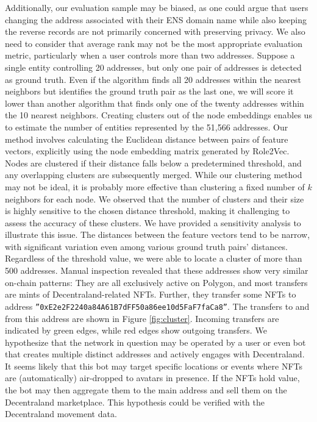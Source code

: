 \documentclass[12pt,a4paper,titlepage,oneside,english]{article}
\begin{document}
Additionally, our evaluation sample may be biased, as one could argue that users changing the address associated with their ENS domain name while also keeping the reverse records are not primarily concerned with preserving privacy. \newline
We also need to consider that average rank may not be the most appropriate evaluation metric, particularly when a user controls more than two addresses. Suppose a single entity controlling 20 addresses, but only one pair of addresses is detected as ground truth. Even if the algorithm finds all 20 addresses within the nearest neighbors but identifies the ground truth pair as the last one, we will score it lower than another algorithm that finds only one of the twenty addresses within the 10 nearest neighbors. \newline
Creating clusters out of the node embeddings enables us to estimate the number of entities represented by the 51,566 addresses. Our method involves calculating the Euclidean distance between pairs of feature vectors, explicitly using the node embedding matrix generated by Role2Vec. Nodes are clustered if their distance falls below a predetermined threshold, and any overlapping clusters are subsequently merged. \newline 
While our clustering method may not be ideal, it is probably more effective than clustering a fixed number of $k$ neighbors for each node. We observed that the number of clusters and their size is highly sensitive to the chosen distance threshold, making it challenging to assess the accuracy of these clusters. We have provided a sensitivity analysis to illustrate this issue. The distances between the feature vectors tend to be narrow, with significant variation even among various ground truth pairs' distances. Regardless of the threshold value, we were able to locate a cluster of more than 500 addresses. Manual inspection revealed that these addresses show very similar on-chain patterns: They are all exclusively active on Polygon, and most transfers are mints of Decentraland-related NFTs. Further, they transfer some NFTs to address \texttt{''0xE2e2F2240a84A61B7dFF50a86ee10d5FaF7faCa8''}. The transfers to and from this address are shown in Figure \ref{fig:cluster}. Incoming transfers are indicated by green edges, while red edges show outgoing transfers. We hypothesize that the network in question may be operated by a user or even bot that creates multiple distinct addresses and actively engages with Decentraland. It seems likely that this bot may target specific locations or events where NFTs are (automatically) air-dropped to avatars in presence. If the NFTs hold value, the bot may then aggregate them to the main address and sell them on the Decentraland marketplace. This hypothesis could be verified with the Decentraland movement data. \newline
\end{document}
